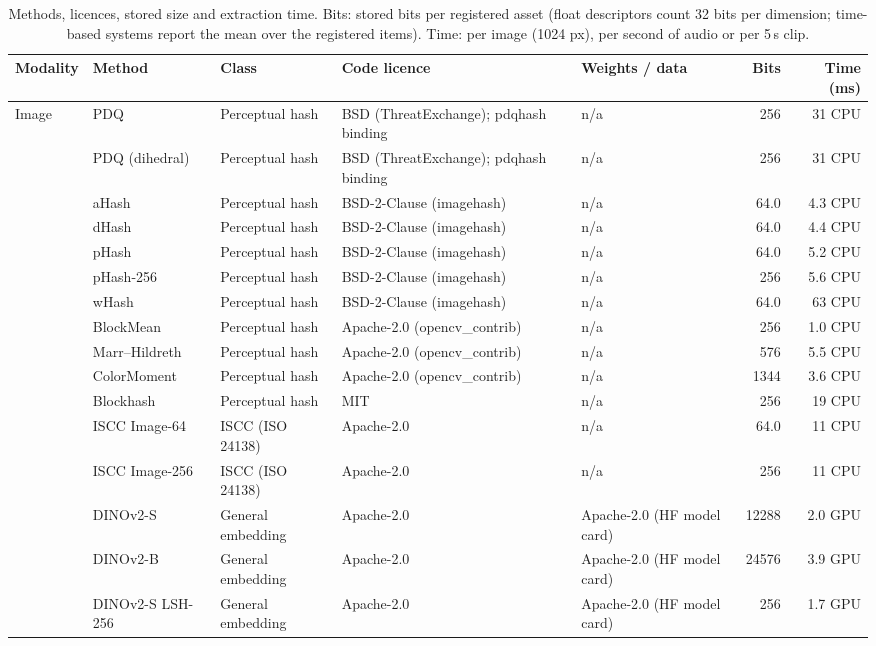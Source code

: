 \begin{table}[!t]
\centering
\scriptsize
\caption{Methods, licences, stored size and extraction time. Bits: stored bits per registered asset (float descriptors count 32 bits per dimension; time-based systems report the mean over the registered items). Time: per image (1024 px), per second of audio or per 5\,s clip.}
\label{tab:methods}
\setlength{\tabcolsep}{3pt}
\begin{tabular}{lllp{3.3cm}p{3.6cm}rr}
\toprule
Modality & Method & Class & Code licence & Weights / data & Bits & Time (ms) \\
\midrule
Image & PDQ & Perceptual hash & BSD (ThreatExchange); pdqhash binding  & n/a & 256 & 31 CPU \\
 & PDQ (dihedral) & Perceptual hash & BSD (ThreatExchange); pdqhash binding  & n/a & 256 & 31 CPU \\
 & aHash & Perceptual hash & BSD-2-Clause (imagehash) & n/a & 64.0 & 4.3 CPU \\
 & dHash & Perceptual hash & BSD-2-Clause (imagehash) & n/a & 64.0 & 4.4 CPU \\
 & pHash & Perceptual hash & BSD-2-Clause (imagehash) & n/a & 64.0 & 5.2 CPU \\
 & pHash-256 & Perceptual hash & BSD-2-Clause (imagehash) & n/a & 256 & 5.6 CPU \\
 & wHash & Perceptual hash & BSD-2-Clause (imagehash) & n/a & 64.0 & 63 CPU \\
 & BlockMean & Perceptual hash & Apache-2.0 (opencv\_contrib) & n/a & 256 & 1.0 CPU \\
 & Marr–Hildreth & Perceptual hash & Apache-2.0 (opencv\_contrib) & n/a & 576 & 5.5 CPU \\
 & ColorMoment & Perceptual hash & Apache-2.0 (opencv\_contrib) & n/a & 1344 & 3.6 CPU \\
 & Blockhash & Perceptual hash & MIT & n/a & 256 & 19 CPU \\
 & ISCC Image-64 & ISCC (ISO 24138) & Apache-2.0 & n/a & 64.0 & 11 CPU \\
 & ISCC Image-256 & ISCC (ISO 24138) & Apache-2.0 & n/a & 256 & 11 CPU \\
 & DINOv2-S & General embedding & Apache-2.0 & Apache-2.0 (HF model card) & 12288 & 2.0 GPU \\
 & DINOv2-B & General embedding & Apache-2.0 & Apache-2.0 (HF model card) & 24576 & 3.9 GPU \\
 & DINOv2-S LSH-256 & General embedding & Apache-2.0 & Apache-2.0 (HF model card) & 256 & 1.7 GPU \\

\end{tabular}
\end{table}

